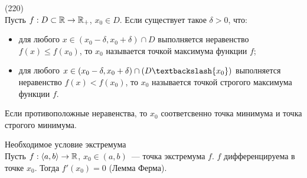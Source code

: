 (220)\\
Пусть $f: D \subset \mathbb{R} \to \mathbb{R}_+$, $x_0 \in D$. Если существует такое $\delta > 0$, что:
\begin{itemize}
	\item для любого $x \in (x_0 - \delta, x_0 + \delta) \cap D$ выполняется неравенство $f(x) \le f(x_0)$, то $x_0$ называется точкой максимума функции $f$;
	\item для любого $x \in (x_0 - \delta, x_0 + \delta) \cap (D\bsl \{x_0\})$ выполняется неравенство $f(x) < f(x_0)$, то $x_0$ называется точкой строгого максимума функции $f$.
\end{itemize} 

Если противоположные неравенства, то $x_0$ соответсвенно точка минимума и точка строгого минимума.

Необходимое условие экстремума\\
Пусть $f: \langle a, b\rangle \to \mathbb{R}$, $x_0\in (a, b)$~--- точка экстремума $f$. $f$ дифференцируема в точке $x_0$. Тогда $f'(x_0) = 0$ (Лемма Ферма).